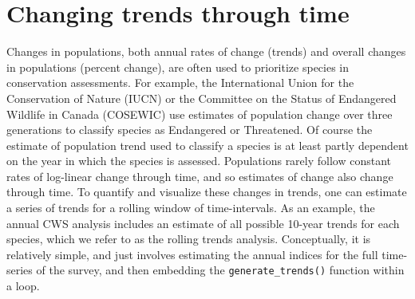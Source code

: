 \documentclass[
]{book}
\begin{document}
\hypertarget{changing-trends-through-time}{%
\section{Changing trends through time}\label{changing-trends-through-time}}

Changes in populations, both annual rates of change (trends) and overall changes in populations (percent change), are often used to prioritize species in conservation assessments. For example, the International Union for the Conservation of Nature (IUCN) or the Committee on the Status of Endangered Wildlife in Canada (COSEWIC) use estimates of population change over three generations to classify species as Endangered or Threatened. Of course the estimate of population trend used to classify a species is at least partly dependent on the year in which the species is assessed. Populations rarely follow constant rates of log-linear change through time, and so estimates of change also change through time. To quantify and visualize these changes in trends, one can estimate a series of trends for a rolling window of time-intervals. As an example, the annual CWS analysis includes an estimate of all possible 10-year trends for each species, which we refer to as the rolling trends analysis. Conceptually, it is relatively simple, and just involves estimating the annual indices for the full time-series of the survey, and then embedding the \texttt{generate\_trends()} function within a loop.
\end{document}
